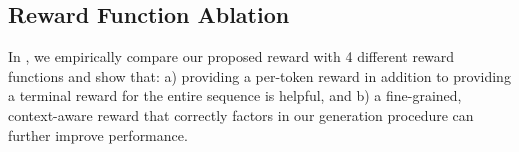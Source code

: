 \begin{table}[t]
  \centering
  \caption{KRLS Ablation Study. The first two are trained directly from the backbone, and the latter two are trained from a $\mathcal{L}_{\mathrm{SL}}$-finetuned checkpoint (see more details in ).}
  \label{tbl:rl_cmp}
\end{table}

\subsection{Reward Function Ablation}
\label{sec:Per-Token Reward Function Ablation}
In , we empirically compare our proposed reward with 4 different reward functions and show that: a) providing a per-token reward in addition to providing a terminal reward for the entire sequence is helpful, and b) a fine-grained, context-aware reward that correctly factors in our generation procedure can further improve performance.

